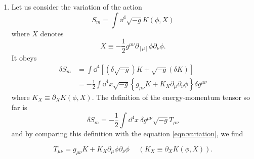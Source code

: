 \documentclass[a4paper,pdftex,10pt]{article}
\begin{document}
\maketitle

\begin{enumerate}
  \item
        Let us consider the variation of the action
        \begin{equation}
          S_{m}
          =
          \int\dd^4 \sqrt{-g}K(\phi,X)
        \end{equation}
        where $X$ denotes
        \begin{equation}
          X
          \equiv
          -
          \frac{1}{2}g^{\mu\nu}\partial_[\mu]\phi\partial_{\nu}\phi
          .
        \end{equation}
        It obeys
        \begin{align}
          \delta S_{m}
           & =
          \int\dd^4
          \left[
            (\delta\sqrt{-g})K
            +
            \sqrt{-g}(\delta K)
            \right]
          \nonumber
          \\
           & =
          -\frac{1}{2}
          \int\dd^4 x
          \sqrt{-g}
          \left\{
          g_{\mu\nu}K
          +
          K_{X}\partial_{\mu}\partial_{\nu}\phi
          \right\}
          \delta g^{\mu\nu}
          \label{eqn:variation}
        \end{align}
        where $K_{X}\equiv \partial_{X}K(\phi,X)$. The definition of the energy-momentum tensor so far is
        \begin{equation}
          \delta S_{m}
          =
          -\frac{1}{2}\int\dd^4 x\
          \delta g^{\mu\nu}\sqrt{-g}T_{\mu\nu}
          \label{eqn:dfn_energy-momentum_tensor}
        \end{equation}
        and by comparing this definition with the equation \eqref{eqn:variation}, we find
        \begin{graybox}
          \begin{equation}
            T_{\mu\nu}
            =
            g_{\mu\nu}K
            +
            K_{X}\partial_{\mu}\phi\partial_{\nu}\phi
            \hspace{15pt}
            (K_{X}\equiv \partial_{X}K(\phi,X))
            .
          \end{equation}
        \end{graybox}


\end{enumerate}
\end{document}
